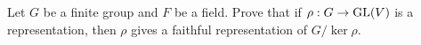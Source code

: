 \begin{prob}
  Let \( G \) be a finite group and \( F \) be a field.
  Prove that if \( \rho: G\rightarrow \operatorname{GL}(V) \) is a representation,
  then \( \rho \) gives a faithful representation of \( G/\ker \rho \).
\end{prob}
  